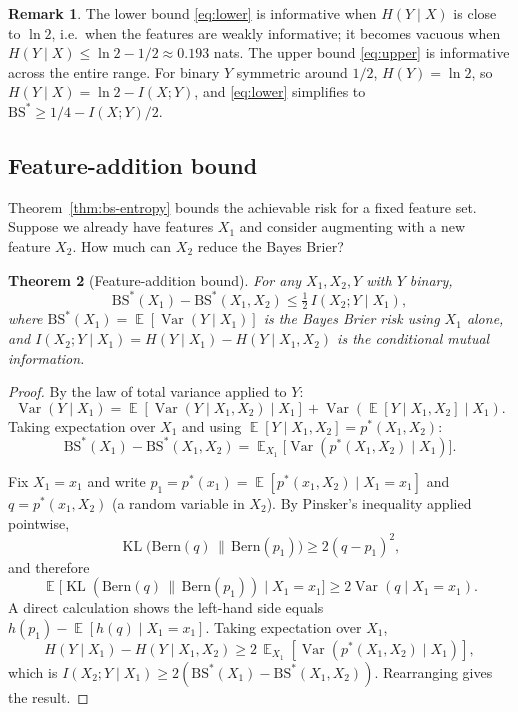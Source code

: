 \documentclass[11pt,a4paper]{article}
\newtheorem{theorem}{Theorem}
\theoremstyle{definition}
\newtheorem{remark}[theorem]{Remark}
\DeclareMathOperator{\E}{\mathbb{E}}
\DeclareMathOperator{\Var}{Var}
\DeclareMathOperator{\KL}{KL}
\newcommand{\BS}{\mathrm{BS}}
\begin{document}
\begin{remark}\label{rmk:bound-tightness}
The lower bound \eqref{eq:lower} is informative when $H(Y \mid X)$ is close to $\ln 2$, i.e.\ when the features are weakly informative; it becomes vacuous when $H(Y \mid X) \le \ln 2 - 1/2 \approx 0.193$ nats. The upper bound \eqref{eq:upper} is informative across the entire range. For binary $Y$ symmetric around $1/2$, $H(Y) = \ln 2$, so $H(Y \mid X) = \ln 2 - I(X; Y)$, and \eqref{eq:lower} simplifies to $\BS^* \ge 1/4 - I(X;Y)/2$.
\end{remark}

\subsection{Feature-addition bound}\label{sec:feature-add}

Theorem~\ref{thm:bs-entropy} bounds the achievable risk for a fixed feature set. Suppose we already have features $X_1$ and consider augmenting with a new feature $X_2$. How much can $X_2$ reduce the Bayes Brier?

\begin{theorem}[Feature-addition bound]\label{thm:feature-add}
For any $X_1, X_2, Y$ with $Y$ binary,
\[
\BS^*(X_1) - \BS^*(X_1, X_2) \le \tfrac{1}{2}\, I(X_2; Y \mid X_1),
\]
where $\BS^*(X_1) = \E[\Var(Y \mid X_1)]$ is the Bayes Brier risk using $X_1$ alone, and $I(X_2; Y \mid X_1) = H(Y \mid X_1) - H(Y \mid X_1, X_2)$ is the conditional mutual information.
\end{theorem}

\begin{proof}
By the law of total variance applied to $Y$:
\[
\Var(Y \mid X_1) = \E[\Var(Y \mid X_1, X_2) \mid X_1] + \Var(\E[Y \mid X_1, X_2] \mid X_1).
\]
Taking expectation over $X_1$ and using $\E[Y \mid X_1, X_2] = p^*(X_1, X_2)$:
\[
\BS^*(X_1) - \BS^*(X_1, X_2) = \E_{X_1}\bigl[\Var(p^*(X_1, X_2) \mid X_1)\bigr].
\]

Fix $X_1 = x_1$ and write $p_1 = p^*(x_1) = \E[p^*(x_1, X_2) \mid X_1 = x_1]$ and $q = p^*(x_1, X_2)$ (a random variable in $X_2$). By Pinsker's inequality applied pointwise,
\[
\KL\bigl(\mathrm{Bern}(q) \,\|\, \mathrm{Bern}(p_1)\bigr) \ge 2(q - p_1)^2,
\]
and therefore
\[
\E\bigl[\KL(\mathrm{Bern}(q) \,\|\, \mathrm{Bern}(p_1)) \mid X_1 = x_1\bigr] \ge 2 \Var(q \mid X_1 = x_1).
\]
A direct calculation shows the left-hand side equals $h(p_1) - \E[h(q) \mid X_1 = x_1]$. Taking expectation over $X_1$,
\[
H(Y \mid X_1) - H(Y \mid X_1, X_2) \ge 2\,\E_{X_1}[\Var(p^*(X_1, X_2) \mid X_1)],
\]
which is $I(X_2; Y \mid X_1) \ge 2 (\BS^*(X_1) - \BS^*(X_1, X_2))$. Rearranging gives the result.
\end{proof}
\end{document}
